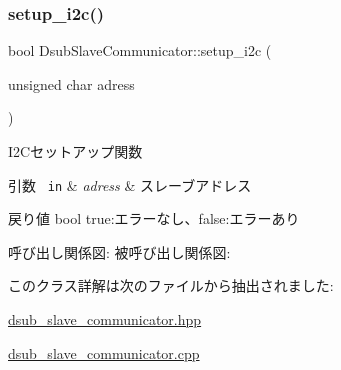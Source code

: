 \subsubsection{\texorpdfstring{setup\_i2c()}{setup\_i2c()}}
{\footnotesize\ttfamily bool Dsub\+Slave\+Communicator\+::setup\+\_\+i2c (\begin{DoxyParamCaption}\item[{unsigned char}]{adress }\end{DoxyParamCaption})}



I2\+Cセットアップ関数 


\begin{DoxyParams}[1]{引数}
\mbox{\texttt{ in}}  & {\em adress} & スレーブアドレス \\
\hline
\end{DoxyParams}
\begin{DoxyReturn}{戻り値}
bool true\+:エラーなし、false\+:エラーあり 
\end{DoxyReturn}
呼び出し関係図\+:
被呼び出し関係図\+:


このクラス詳解は次のファイルから抽出されました\+:\begin{DoxyCompactItemize}
\item 
\mbox{\hyperlink{dsub__slave__communicator_8hpp}{dsub\+\_\+slave\+\_\+communicator.\+hpp}}\item 
\mbox{\hyperlink{dsub__slave__communicator_8cpp}{dsub\+\_\+slave\+\_\+communicator.\+cpp}}\end{DoxyCompactItemize}
